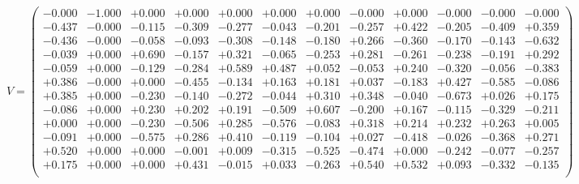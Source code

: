 \documentclass[9pt]{article}
\theoremstyle{plain}
\theoremstyle{definition}
\theoremstyle{remark}
\numberwithin{equation}{section}
\begin{document}
$V = \left(
\begin{array}{
cccccccccccc}
-0.000 & -1.000 & +0.000 & +0.000 & +0.000 & +0.000 & +0.000 & -0.000 & +0.000 & -0.000 & -0.000 & -0.000 \\
-0.437 & -0.000 & -0.115 & -0.309 & -0.277 & -0.043 & -0.201 & -0.257 & +0.422 & -0.205 & -0.409 & +0.359 \\
-0.436 & -0.000 & -0.058 & -0.093 & -0.308 & -0.148 & -0.180 & +0.266 & -0.360 & -0.170 & -0.143 & -0.632 \\
-0.039 & +0.000 & +0.690 & -0.157 & +0.321 & -0.065 & -0.253 & +0.281 & -0.261 & -0.238 & -0.191 & +0.292 \\
-0.059 & +0.000 & -0.129 & -0.284 & +0.589 & +0.487 & +0.052 & -0.053 & +0.240 & -0.320 & -0.056 & -0.383 \\
+0.386 & -0.000 & +0.000 & -0.455 & -0.134 & +0.163 & +0.181 & +0.037 & -0.183 & +0.427 & -0.585 & -0.086 \\
+0.385 & +0.000 & -0.230 & -0.140 & -0.272 & -0.044 & +0.310 & +0.348 & -0.040 & -0.673 & +0.026 & +0.175 \\
-0.086 & +0.000 & +0.230 & +0.202 & +0.191 & -0.509 & +0.607 & -0.200 & +0.167 & -0.115 & -0.329 & -0.211 \\
+0.000 & +0.000 & -0.230 & -0.506 & +0.285 & -0.576 & -0.083 & +0.318 & +0.214 & +0.232 & +0.263 & +0.005 \\
-0.091 & +0.000 & -0.575 & +0.286 & +0.410 & -0.119 & -0.104 & +0.027 & -0.418 & -0.026 & -0.368 & +0.271 \\
+0.520 & +0.000 & +0.000 & -0.001 & +0.009 & -0.315 & -0.525 & -0.474 & +0.000 & -0.242 & -0.077 & -0.257 \\
+0.175 & +0.000 & +0.000 & +0.431 & -0.015 & +0.033 & -0.263 & +0.540 & +0.532 & +0.093 & -0.332 & -0.135 \\
\end{array}
\right)$ \newline 
\end{document}
